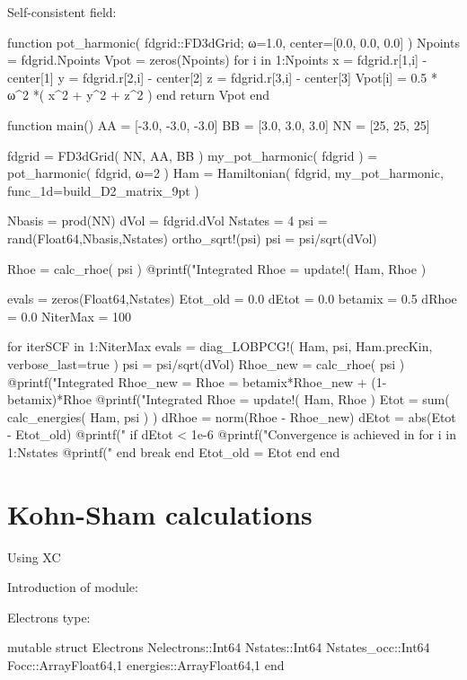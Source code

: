 Self-consistent field:
\begin{juliacode}
function pot_harmonic( fdgrid::FD3dGrid; ω=1.0, center=[0.0, 0.0, 0.0] )
  Npoints = fdgrid.Npoints
  Vpot = zeros(Npoints)
  for i in 1:Npoints
    x = fdgrid.r[1,i] - center[1]
    y = fdgrid.r[2,i] - center[2]
    z = fdgrid.r[3,i] - center[3]
    Vpot[i] = 0.5 * ω^2 *( x^2 + y^2 + z^2 )
  end
  return Vpot
end

function main()
  AA = [-3.0, -3.0, -3.0]
  BB = [3.0, 3.0, 3.0]
  NN = [25, 25, 25]

  fdgrid = FD3dGrid( NN, AA, BB )
  my_pot_harmonic( fdgrid ) = pot_harmonic( fdgrid, ω=2 )
  Ham = Hamiltonian( fdgrid, my_pot_harmonic, func_1d=build_D2_matrix_9pt )

  Nbasis = prod(NN)
  dVol = fdgrid.dVol
  Nstates = 4
  psi = rand(Float64,Nbasis,Nstates)
  ortho_sqrt!(psi)
  psi = psi/sqrt(dVol)

  Rhoe = calc_rhoe( psi )
  @printf("Integrated Rhoe = %
  update!( Ham, Rhoe )

  evals = zeros(Float64,Nstates)
  Etot_old = 0.0
  dEtot = 0.0
  betamix = 0.5
  dRhoe = 0.0
  NiterMax = 100

  for iterSCF in 1:NiterMax
    evals = diag_LOBPCG!( Ham, psi, Ham.precKin, verbose_last=true )
    psi = psi/sqrt(dVol)
    Rhoe_new = calc_rhoe( psi )
    @printf("Integrated Rhoe_new = %
    Rhoe = betamix*Rhoe_new + (1-betamix)*Rhoe
    @printf("Integrated Rhoe     = %
    update!( Ham, Rhoe )
    Etot = sum( calc_energies( Ham, psi ) )
    dRhoe = norm(Rhoe - Rhoe_new)
    dEtot = abs(Etot - Etot_old)
    @printf("%
    if dEtot < 1e-6
      @printf("Convergence is achieved in %
      for i in 1:Nstates
        @printf("%
      end
      break
    end
    Etot_old = Etot
  end
end
\end{juliacode}

\section{Kohn-Sham calculations}

Using XC

Introduction of module:

Electrons type:
\begin{juliacode}
mutable struct Electrons
  Nelectrons::Int64
  Nstates::Int64
  Nstates_occ::Int64
  Focc::Array{Float64,1}
  energies::Array{Float64,1}
end
\end{juliacode}


